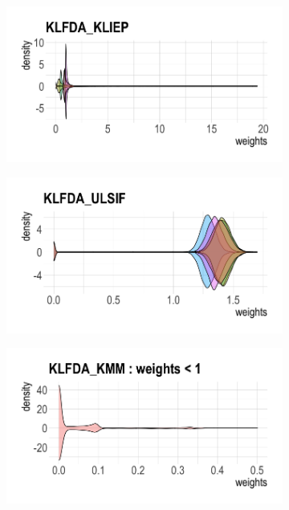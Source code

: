 \documentclass[a4paper,12pt]{article}
\begin{document}
\begin{figure}[H]
\begin{subfigure}{.32\textwidth}
  \centering
  \includegraphics[width=\linewidth]{bio1.png}
  \label{fig:sfig1}
\end{subfigure}
\begin{subfigure}{.32\textwidth}
  \centering
  \includegraphics[width=\linewidth]{bio2.png}
  \label{fig:sfig2}
\end{subfigure} 
\begin{subfigure}{.32\textwidth}
  \centering
  \includegraphics[width=\linewidth]{bio8.png}

\end{subfigure}
\end{figure}
\end{document}
